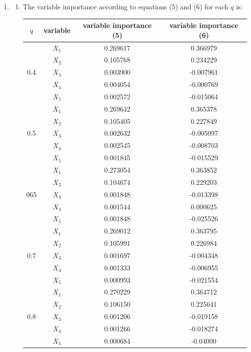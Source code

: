 \documentclass[paper=letter, fontsize=12pt]{article}
\begin{document}
\begin{enumerate}[label=(\alph*)]
	\item 
	\begin{enumerate}[label=(\roman*)]
		\item The variable importance according to equations (5) and (6) for each $q$ is:
		
		\begin{longtable}{|c|c|c|c|}
			\hline
			$q$ & variable & variable importance (5) & variable importance (6) \\ \hline
			\multirow{5}{1em}{0.4} & $X_1$ & 0.269617 & 0.366979 \\ 
			& $X_2$ & 0.105768 & 0.234229 \\
			& $X_3$ & 0.003900 & -0.007961\\
			& $X_4$ & 0.004054 & -0.000769 \\
			& $X_5$ & 0.002572 & -0.015064 \\
			\hline
			\multirow{5}{1em}{0.5} & $X_1$ & 0.269642 & 0.365378 \\ 
			& $X_2$ & 0.105405 & 0.227849 \\
			& $X_3$ & 0.002632 & -0.005097 \\
			& $X_4$ & 0.002545 & -0.008703 \\
			& $X_5$ & 0.001845 & -0.015529 \\
			\hline
			\multirow{5}{1em}{065} & $X_1$ & 0.273054 & 0.363852 \\ 
			& $X_2$ & 0.104674 & 0.229203 \\
			& $X_3$ & 0.001848 & -0.013398 \\
			& $X_4$ & 0.001544 & 0.000625 \\
			& $X_5$ & 0.001848 & -0.025526 \\
			\hline
			\multirow{5}{1em}{0.7} & $X_1$ & 0.269012 & 0.363795 \\ 
			& $X_2$ & 0.105991 & 0.226984 \\
			& $X_3$ & 0.001697 & -0.004348 \\
			& $X_4$ & 0.001333 & -0.006955 \\
			& $X_5$ & 0.000993 & -0.021554\\
			\hline
			\multirow{5}{1em}{0.8} & $X_1$ & 0.270229 & 0.364712 \\ 
			& $X_2$ & 0.106150 & 0.225641 \\
			& $X_3$ & 0.001206 & -0.019158 \\
			& $X_4$ & 0.001266 & -0.018274 \\
			& $X_5$ & 0.000684 & -0.04000 \\
			\hline
		\end{longtable}


\end{enumerate}
\end{enumerate}
\end{document}
